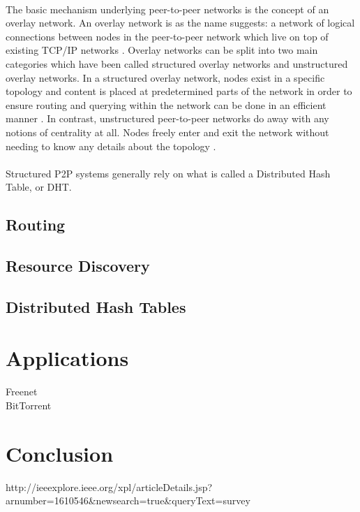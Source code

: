 \documentclass[12pt,letterpaper]{article}
\begin{document}
\paragraph{}

The basic mechanism underlying peer-to-peer networks is the concept of an overlay network. 
An overlay network is as the name suggests: a network of logical connections between nodes in the peer-to-peer network which live on top of existing TCP/IP networks \cite{overlay}. 
Overlay networks can be split into two main categories which have been called structured overlay networks and unstructured overlay networks. 
In a structured overlay network, nodes exist in a specific topology and content is placed at predetermined parts of the network in order to ensure routing and querying within the network can be done in an efficient manner \cite{overlay}. 
In contrast, unstructured peer-to-peer networks do away with any notions of centrality at all. 
Nodes freely enter and exit the network without needing to know any details about the topology \cite{overlay}.

\paragraph{}

Structured P2P systems generally rely on what is called a Distributed Hash Table, or DHT.

\subsection{Routing}

\subsection{Resource Discovery}

\subsection{Distributed Hash Tables}

\section{Applications}

Freenet\\
BitTorrent\\

\section{Conclusion}

\begin{thebibliography}{1}

    http://ieeexplore.ieee.org/xpl/articleDetails.jsp?arnumber=1610546&newsearch=true&queryText=survey%

\end{thebibliography}
\end{document}
